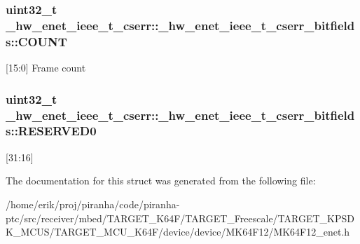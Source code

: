 \subsubsection[{\texorpdfstring{C\+O\+U\+NT}{COUNT}}]{\setlength{\rightskip}{0pt plus 5cm}uint32\+\_\+t \+\_\+hw\+\_\+enet\+\_\+ieee\+\_\+t\+\_\+cserr\+::\+\_\+hw\+\_\+enet\+\_\+ieee\+\_\+t\+\_\+cserr\+\_\+bitfields\+::\+C\+O\+U\+NT}\hypertarget{struct__hw__enet__ieee__t__cserr_1_1__hw__enet__ieee__t__cserr__bitfields_acb5ed55f12a1524f701978cb17723c10}{}\label{struct__hw__enet__ieee__t__cserr_1_1__hw__enet__ieee__t__cserr__bitfields_acb5ed55f12a1524f701978cb17723c10}
\mbox{[}15\+:0\mbox{]} Frame count 
\subsubsection[{\texorpdfstring{R\+E\+S\+E\+R\+V\+E\+D0}{RESERVED0}}]{\setlength{\rightskip}{0pt plus 5cm}uint32\+\_\+t \+\_\+hw\+\_\+enet\+\_\+ieee\+\_\+t\+\_\+cserr\+::\+\_\+hw\+\_\+enet\+\_\+ieee\+\_\+t\+\_\+cserr\+\_\+bitfields\+::\+R\+E\+S\+E\+R\+V\+E\+D0}\hypertarget{struct__hw__enet__ieee__t__cserr_1_1__hw__enet__ieee__t__cserr__bitfields_a71011f563ec1bb4ca606e5c7cc885676}{}\label{struct__hw__enet__ieee__t__cserr_1_1__hw__enet__ieee__t__cserr__bitfields_a71011f563ec1bb4ca606e5c7cc885676}
\mbox{[}31\+:16\mbox{]} 

The documentation for this struct was generated from the following file\+:\begin{DoxyCompactItemize}
\item 
/home/erik/proj/piranha/code/piranha-\/ptc/src/receiver/mbed/\+T\+A\+R\+G\+E\+T\+\_\+\+K64\+F/\+T\+A\+R\+G\+E\+T\+\_\+\+Freescale/\+T\+A\+R\+G\+E\+T\+\_\+\+K\+P\+S\+D\+K\+\_\+\+M\+C\+U\+S/\+T\+A\+R\+G\+E\+T\+\_\+\+M\+C\+U\+\_\+\+K64\+F/device/device/\+M\+K64\+F12/M\+K64\+F12\+\_\+enet.\+h\end{DoxyCompactItemize}
